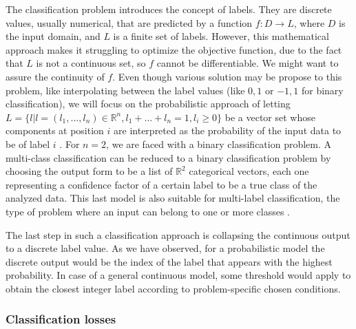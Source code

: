 \par The classification problem introduces the concept of labels. They are discrete values, usually numerical, that are predicted by a function $f:D\rightarrow L$, where $D$ is the input domain, and $L$ is a finite set of labels. However, this mathematical approach makes it struggling to optimize the objective function, due to the fact that $L$ is not a continuous set, so $f$ cannot be differentiable. We might want to assure the continuity of $f$. Even though various solution may be propose to this problem, like interpolating between the label values (like ${0,1}$ or ${-1,1}$ for binary classification), we will focus on the probabilistic approach of letting $L=\{ l | l=(l_1,\ldots,l_n)\in\mathbb{R}^{n}, l_1+\ldots+l_n=1, l_i\geq 0\}$ be a vector set whose components at position $i$ are interpreted as the probability of the input data to be of label $i$ \cite{D2l}. For $n=2$, we are faced with a binary classification problem. A multi-class classification can be reduced to a binary classification problem by choosing the output form to be a list of $\mathbb{R}^2$ categorical vectors, each one representing a confidence factor of a certain label to be a true class of the analyzed data. This last model is also suitable for multi-label classification, the type of problem where an input can belong to one or more classes \cite{D2l}.
\par The last step in such a classification approach is collapsing the continuous output to a discrete label value. As we have observed, for a probabilistic model the discrete output would be the index of the label that appears with the highest probability. In case of a general continuous model, some threshold would apply to obtain the closest integer label according to problem-specific chosen conditions.


\subsubsection{Classification losses}
\label{subsubsec:ch3sec2subsec4subsubsec1}

